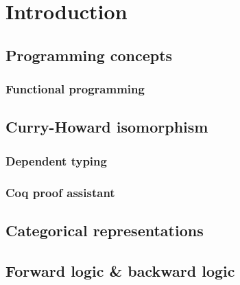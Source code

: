 \chapter{Introduction}

\section{Programming concepts}
\subsection{Functional programming}

\section{Curry-Howard isomorphism}
\subsection{Dependent typing}
\subsection{Coq proof assistant}

\section{Categorical representations}
\section{Forward logic \& backward logic}